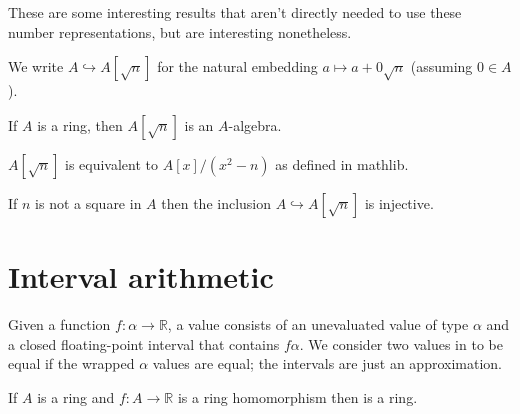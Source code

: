 These are some interesting results that aren't directly needed to use these
number representations, but are interesting nonetheless.


\begin{definition}
  \label{def:adjoinEmbedding}
  \leanok
  We write $A \hookrightarrow A[\sqrt{n}]$ for the natural embedding
  $a \mapsto a + 0\sqrt{n}$ (assuming $0 ∈ A$).
\end{definition}


\begin{lemma}
  \label{thm:adjoinAlgebra}
  \leanok
  If $A$ is a ring, then $A[\sqrt{n}]$ is an $A$-algebra.
\end{lemma}

\begin{lemma}
  \label{thm:mathlibAdjoin}
  $A[\sqrt{n}]$ is equivalent to $A[x] / (x^2 - n)$ as defined in mathlib.
\end{lemma}


\begin{lemma}
  \label{thm:adjoinInjective}
  If $n$ is not a square in $A$ then the inclusion $A \hookrightarrow
  A[\sqrt{n}]$ is injective.
\end{lemma}

\section{Interval arithmetic}

\begin{definition}
  \label{def:filtered}
  \leanok
  Given a function $f : α → ℝ$, a  value consists of
  an unevaluated value of type $α$ and a closed floating-point interval that
  contains $f α$. We consider two values in  to be
  equal if the wrapped $α$ values are equal; the intervals are just an
  approximation.
\end{definition}

\begin{lemma}
  \label{thm:filteredRing}
  If $A$ is a ring and $f : A → ℝ$ is a ring homomorphism then 
  is a ring.
\end{lemma}

